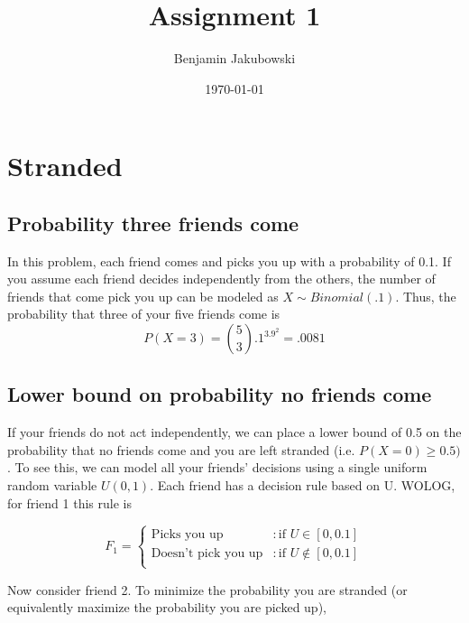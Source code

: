 \documentclass[paper=a4, fontsize=11pt]{scrartcl} %
\title{	Assignment 1}
\author{Benjamin Jakubowski} %
\date{\normalsize\today} %
\numberwithin{equation}{section} %
\numberwithin{figure}{section} %
\numberwithin{table}{section} %
\begin{document}
\maketitle %


\section{Stranded}

\subsection{Probability three friends come}

In this problem, each friend comes and picks you up with a probability of 0.1. If you assume each friend decides independently from the others, the number of friends that come pick you up can be modeled as $X \sim Binomial(.1)$. Thus, the probability that three of your five friends come is
\begin{equation*}
P(X=3) = {5 \choose 3}.1^3.9^ 2 = .0081
\end{equation*}

\subsection{Lower bound on probability no friends come}

If your friends do not act independently, we can place a lower bound of 0.5 on the probability that no friends come and you are left stranded (i.e. $P(X=0) \geq 0.5)$. To see this, we can model all your friends' decisions using a single uniform random variable $U(0,1)$. Each friend has a decision rule based on U. WOLOG, for friend 1 this rule is

 \begin{displaymath}
   F_1 = \left\{
     \begin{array}{lr}
       \text{Picks you up} & : \text{if } U \in [0,0.1]\\
       \text{Doesn't pick you up} & : \text{if } U \notin [0,0.1]\\
     \end{array}
   \right.
\end{displaymath} 


 Now consider friend 2. To minimize the probability you are stranded (or equivalently maximize the probability you are picked up), 
 
\end{document}

